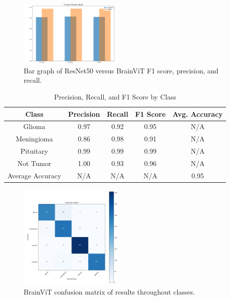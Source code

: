 \documentclass[conference]{IEEEtran}
\begin{document}
\begin{figure}[htbp]
    \centering
    \includegraphics[width=0.45\textwidth]{resnet versus brainvit2.PNG}
    \caption{Bar graph of ResNet50 versus BrainViT F1 score, precision, and recall.}
    \label{fig:4}
\end{figure}

\begin{table}[htbp]
    \centering
    \caption{Precision, Recall, and F1 Score by Class}
    \label{tab:example_with_headers}
    \begin{tabular}{|c|c|c|c|c|}
        \hline
        \textbf{Class} & \textbf{Precision} & \textbf{Recall} & \textbf{F1 Score} & \textbf{Avg. Accuracy}\\ 
        \hline
        Glioma & 0.97 & 0.92 & 0.95 & N/A\\ 
        Meningioma & 0.86 & 0.98 & 0.91 & N/A \\ 
        Pituitary & 0.99 & 0.99 & 0.99 & N/A\\
        Not Tumor & 1.00 & 0.93 & 0.96 & N/A\\
        Average Accuracy & N/A & N/A & N/A & 0.95 \\
        \hline
    \end{tabular}
\end{table}

\begin{figure}[h]
    \centering
    \includegraphics[width=0.45\textwidth]{results cm.PNG}
    \caption{BrainViT confusion matrix of results throughout classes.}
    \label{fig:cm}
\end{figure}
\end{document}
